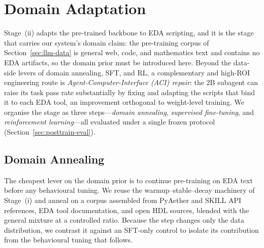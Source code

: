 ﻿\section{Domain Adaptation}\label{sec:llm-posttrain}

Stage~(ii) adapts the pre-trained backbone to EDA scripting, and it is the stage that carries our system's domain claim: the pre-training corpus of Section~\ref{sec:llm-data} is general web, code, and mathematics text and contains no EDA artifacts, so the domain prior must be introduced here.
Beyond the data-side levers of domain annealing, SFT, and RL, a complementary and high-ROI engineering route is \emph{Agent-Computer-Interface (ACI) repair}: the 2B subagent can raise its task pass rate substantially by fixing and adapting the scripts that bind it to each EDA tool, an improvement orthogonal to weight-level training.
We organise the stage as three steps---\emph{domain annealing}, \emph{supervised fine-tuning}, and \emph{reinforcement learning}---all evaluated under a single frozen protocol (Section~\ref{sec:posttrain-eval}).

\subsection{Domain Annealing}\label{sec:posttrain-anneal}
The cheapest lever on the domain prior is to continue pre-training on EDA text before any behavioural tuning.
We reuse the warmup--stable--decay machinery of Stage~(i) and anneal on a corpus assembled from PyAether and SKILL API references, EDA tool documentation, and open HDL sources, blended with the general mixture at a controlled ratio.
Because the step changes only the data distribution, we contrast it against an SFT-only control to isolate its contribution from the behavioural tuning that follows.

